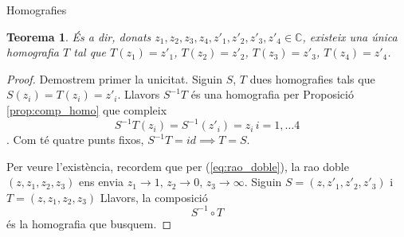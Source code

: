 \documentclass[dvipsnames, svgnames, leqno, a4paper, 12pt]{report}
\numberwithin{equation}{chapter}
\newtheorem{theorem}{Teorema}[chapter]
\theoremstyle{definition}
\theoremstyle{remark}
\newcommand{\C}{\mathbb{C}}
\begin{document}
\begin{chapter}{Homografies}
\begin{theorem}
        És a dir, donats $z_1,z_2,z_3,z_4,z'_1,z'_2,z'_3,z'_4\in\C$, existeix una única homografia $T$ tal que $T(z_1)=z'_1$, $T(z_2)=z'_2$, $T(z_3)=z'_3$, $T(z_4)=z'_4$.
    \end{theorem}
    \begin{proof}
        Demostrem primer la unicitat. Siguin $S$, $T$ dues homografies tals que $S(z_i)=T(z_i)=z'_i$. Llavors $S^{-1}T$ és una homografia per Proposició \ref{prop:comp_homo} que compleix \[S^{-1}T(z_i)=S^{-1}(z'_i)=z_i\, i=1,\dots4\]. Com té quatre punts fixos, $S^{-1}T=id\implies T=S$.

        Per veure l'existència, recordem que per (\ref{eq:rao_doble}), la rao doble $(z,z_1,z_2,z_3)$ ens envia $z_1\to1,\, z_2\to0,\, z_3\to\infty$. 
        Siguin $S=(z,z'_1,z'_2,z'_3)$ i $T=(z,z_1,z_2,z_3)$
        Llavors, la composició \begin{displaymath}
            S^{-1}\circ T
        \end{displaymath}
        és la homografia que busquem.
    \end{proof}
\end{chapter}
\end{document}
